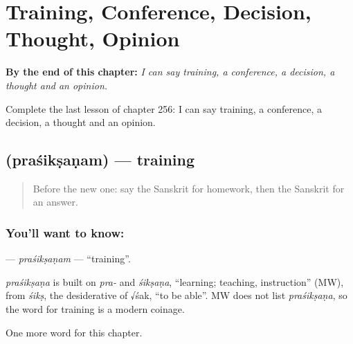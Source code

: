 
\chapter{Training, Conference, Decision, Thought, Opinion}
\label{ch:sa-training-conference-decision-thought-opinion}

\begin{chapteropening}
\textbf{By the end of this chapter:} \emph{I can say training, a conference, a decision, a thought and an opinion.}

Complete the last lesson of chapter 256: I can say training, a conference, a decision, a thought and an opinion.
\end{chapteropening}

\section[\texorpdfstring{\sk{प्रशिक्षणम्} (praśikṣaṇam)}{प्रशिक्षणम् (praśikṣaṇam)}]{ (praśikṣaṇam) — training}

\label{lesson:SA-C256-prasiksanam}



\begin{quote}
Before the new one: say the Sanskrit for homework, then the Sanskrit for an answer.
\end{quote}

\subsection*{You'll want to know: }
\textbf{} — \emph{praśikṣaṇam} — \textquotedblleft{}training\textquotedblright{}.

\begin{cousinweb}
\emph{praśikṣaṇa} is built on \emph{pra-} and \emph{śikṣaṇa}, \textquotedblleft{}learning; teaching, instruction\textquotedblright{} (MW), from \emph{śikṣ}, the desiderative of √śak, \textquotedblleft{}to be able\textquotedblright{}. MW does not list \emph{praśikṣaṇa}, so the word for training is a modern coinage.
\end{cousinweb}

\begin{grammarlens}[title={What you've built}]
One more word for this chapter.
\end{grammarlens}

